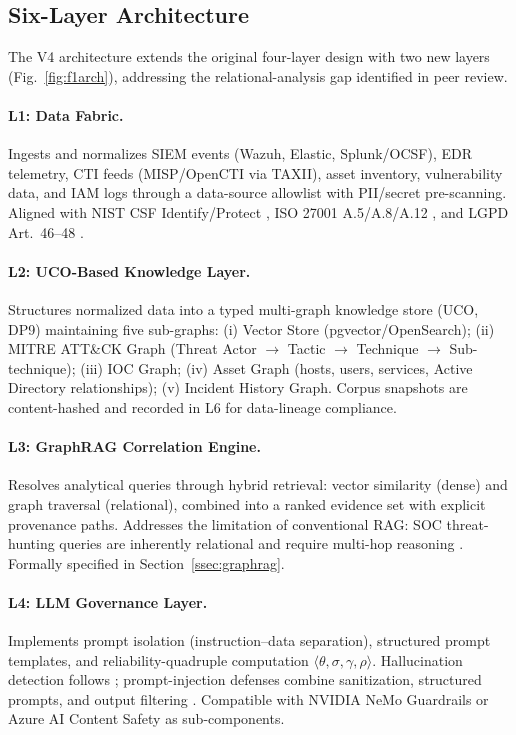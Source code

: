 \documentclass[journal]{IEEEtran}
\begin{document}
\subsection{Six-Layer Architecture}
\label{ssec:architecture}

The V4 architecture extends the original four-layer design with two new layers
(Fig.~\ref{fig:f1arch}), addressing the relational-analysis gap identified in peer review.

\paragraph{L1: Data Fabric.}
Ingests and normalizes SIEM events (Wazuh, Elastic, Splunk/OCSF), EDR telemetry, CTI feeds
(MISP/OpenCTI via TAXII), asset inventory, vulnerability data, and IAM logs through a
data-source allowlist with PII/secret pre-scanning. Aligned with NIST CSF Identify/Protect
\cite{nist2024csf}, ISO 27001 A.5/A.8/A.12 \cite{iso27001}, and LGPD Art.~46--48
\cite{lgpd2018}.

\paragraph{L2: UCO-Based Knowledge Layer.}
Structures normalized data into a typed multi-graph knowledge store (UCO, DP9) maintaining
five sub-graphs: (i) Vector Store (pgvector/OpenSearch); (ii) MITRE ATT\&CK Graph
(Threat Actor $\to$ Tactic $\to$ Technique $\to$ Sub-technique); (iii) IOC Graph; (iv) Asset
Graph (hosts, users, services, Active Directory relationships); (v) Incident History Graph.
Corpus snapshots are content-hashed and recorded in L6 for data-lineage compliance.

\paragraph{L3: GraphRAG Correlation Engine.}
Resolves analytical queries through hybrid retrieval: vector similarity (dense) and graph
traversal (relational), combined into a ranked evidence set with explicit provenance paths.
Addresses the limitation of conventional RAG: SOC threat-hunting queries are inherently
relational and require multi-hop reasoning \cite{cyberrag2025}. Formally specified in
Section~\ref{ssec:graphrag}.

\paragraph{L4: LLM Governance Layer.}
Implements prompt isolation (instruction--data separation), structured prompt templates,
and reliability-quadruple computation $\langle\theta, \sigma, \gamma, \rho\rangle$.
Hallucination detection follows \cite{manakul2023selfcheckgpt}; prompt-injection defenses
combine sanitization, structured prompts, and output filtering
\cite{liu2024formalizing,greshake2023indirect}.
Compatible with NVIDIA NeMo Guardrails or Azure AI Content Safety as sub-components.
\end{document}
